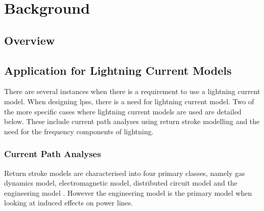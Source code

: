 
\chapter{Background} %

\label{ChapterBackground} %

\begin{quote}
\end{quote}


\section{Overview}
\label{sec:background_overview}



\section{Application for Lightning Current Models}
\label{sec:background_applications}
There are several instances when there is a requirement to use a lightning current model. When designing \glspl{lps}, there is a need for lightning current model. Two of the more specific cases where lightning current models are used are detailed below. These include current path analyses using return stroke modelling and the need for the frequency components of lightning.
\subsection{Current Path Analyses}
\label{sub:background_lemp}
Return stroke models are characterised into four primary classes, namely gas dynamics model, electromagnetic model, distributed circuit model and the engineering model \cite{Paolone2009,Rakov2003,Rakov2009}. However the engineering model is the primary model when looking at induced effects on power lines.

